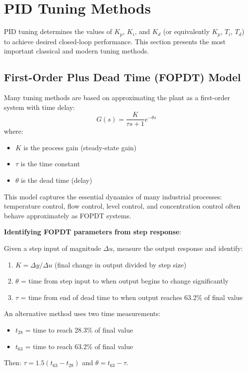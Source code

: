 \section{PID Tuning Methods}
\label{sec:pid_tuning}

PID tuning determines the values of $K_p$, $K_i$, and $K_d$ (or equivalently $K_p$, $T_i$, $T_d$) to achieve desired closed-loop performance. This section presents the most important classical and modern tuning methods.

\subsection{First-Order Plus Dead Time (FOPDT) Model}
\label{subsec:fopdt_model}

Many tuning methods are based on approximating the plant as a first-order system with time delay:
\begin{equation}
G(s) = \frac{K}{\tau s + 1} e^{-\theta s}
\label{eq:fopdt}
\end{equation}
where:
\begin{itemize}
    \item $K$ is the process gain (steady-state gain)
    \item $\tau$ is the time constant
    \item $\theta$ is the dead time (delay)
\end{itemize}

This model captures the essential dynamics of many industrial processes: temperature control, flow control, level control, and concentration control often behave approximately as FOPDT systems.

\textbf{Identifying FOPDT parameters from step response}:

Given a step input of magnitude $\Delta u$, measure the output response and identify:
\begin{enumerate}
    \item $K = \Delta y / \Delta u$ (final change in output divided by step size)
    \item $\theta$ = time from step input to when output begins to change significantly
    \item $\tau$ = time from end of dead time to when output reaches 63.2\% of final value
\end{enumerate}

An alternative method uses two time measurements:
\begin{itemize}
    \item $t_{28}$ = time to reach 28.3\% of final value
    \item $t_{63}$ = time to reach 63.2\% of final value
\end{itemize}
Then: $\tau = 1.5(t_{63} - t_{28})$ and $\theta = t_{63} - \tau$.

